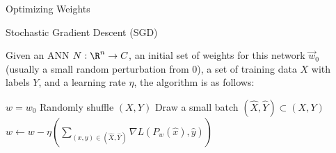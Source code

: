\begin{frame}{Optimizing Weights}
\begin{definition}{Stochastic Gradient Descent (SGD)}

Given an ANN $N: \R^n \to C$, an initial set of weights for this network $\vec w_0$ (usually a small random perturbation from 0), a set of training data $X$ with labels $Y$, and a learning rate $\eta$, the algorithm is as follows: 

\begin{algorithm}[H]
\caption*{Batch Stochastic Gradient Descent}\label{sgd}
\begin{algorithmic}[H]
\State $w = w_0$
 
\State Randomly shuffle $(X,Y)$
\State Draw a small batch $(\hat X, \hat Y) \subset (X, Y)$
\State $w \leftarrow w - \eta \left(\sum_{(x,y) \in (\hat X, \hat Y)}  \nabla L(P_w(\hat x), \hat y)\right)$
\EndWhile
\end{algorithmic}
\end{algorithm}
\end{definition}
\end{frame}
